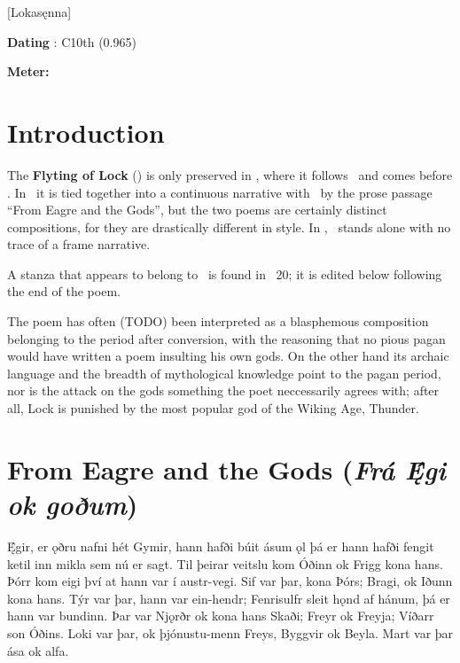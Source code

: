 [Lokasęnna]
\def\thisBookCode{Lokasenna}

\begin{flushright}%
\textbf{Dating} \parencite{Sapp2022}: C10th (0.965)

\textbf{Meter:} \Ljodahattr%
\end{flushright}

\section{Introduction}

{\small The \textbf{Flyting of Lock} (\Lokasenna) is only preserved in \Regius, where it follows \Hymiskvida\ and comes before \Thrymskvida.  In \Regius\ it is tied together into a continuous narrative with \Hymiskvida\ by the prose passage “From Eagre and the Gods”, but the two poems are certainly distinct compositions, for they are drastically different in style.  In \AM, \Hymiskvida\ stands alone with no trace of a frame narrative.

A stanza that appears to belong to \Lokasenna\ is found in \Gylfaginning\ 20; it is edited below following the end of the poem.

\sectionline

The poem has often (TODO) been interpreted as a blasphemous composition belonging to the period after conversion, with the reasoning that no pious pagan would have written a poem insulting his own gods.  On the other hand its archaic language and the breadth of mythological knowledge point to the pagan period, nor is the attack on the gods something the poet neccessarily agrees with; after all, Lock is punished by the most popular god of the Wiking Age, Thunder.}

\sectionline

\section{From Eagre and the Gods (\emph{Frá Ę́gi ok goðum})}

\bpg\bpa Ę́gir, er ǫðru nafni hét Gymir, hann hafði búit ásum ǫl þá er hann hafði fengit ketil inn mikla sem nú er sagt. Til þeirar veitslu kom Óðinn ok Frigg kona hans. Þórr kom eigi því at hann var í austr-vegi. Sif var þar, kona Þórs; Bragi, ok Iðunn kona hans. Týr var þar, hann var ein-hendr; Fenrisulfr sleit hǫnd af hánum, þá er hann var bundinn. Þar var Njǫrðr ok kona hans Skaði; Freyr ok Freyja; Víðarr son Óðins. Loki var þar, ok þjónustu-menn Freys, Byggvir ok Beyla. Mart var þar ása ok alfa.\epa

